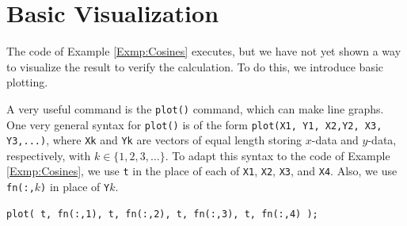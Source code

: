 
\section{Basic Visualization}
The code of Example \ref{Exmp:Cosines} executes, but we have not yet shown a way to visualize the result to verify the calculation. To do this, we introduce basic plotting.

A very useful command is the \texttt{plot()} command, which can make line graphs. One very general syntax for \texttt{plot()} is of the form \verb!plot(X1, Y1, X2,Y2, X3, Y3,...)!, where \texttt{Xk} and \texttt{Yk} are vectors of equal length storing $x$-data and $y$-data, respectively, with $k \in \{1, 2, 3, \ldots\}$. To adapt this syntax to the code of Example \ref{Exmp:Cosines}, we use \texttt{t} in the place of each of \texttt{X1}, \texttt{X2}, \texttt{X3}, and \texttt{X4}. Also, we use \texttt{fn(:,}$k$\texttt{)} in place of \verb!Y!$k$.
\begin{lstlisting}[style=Matlab-editor]
plot( t, fn(:,1), t, fn(:,2), t, fn(:,3), t, fn(:,4) );
\end{lstlisting}


